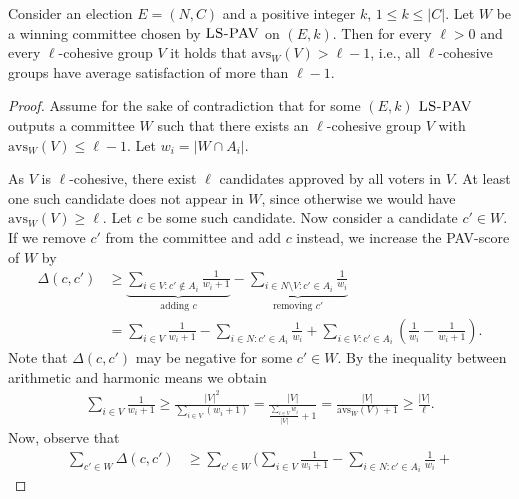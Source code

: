 \documentclass[envcountsame]{llncs}
\newcommand{\ejrls}{{{\textsc{LS-PAV}}}}
\newcommand{\aver}[1]{{{\mathrm{avs}_{#1}}}}
\begin{document}
\begin{theorem}\label{thm:avrep}
Consider an election $E=(N, C)$ and a positive integer $k$, $1\le k \le |C|$.
Let $W$ be a winning committee chosen by $\ejrls$ on $(E, k)$.
Then for every $\ell>0$ and every $\ell$-cohesive group $V$ it holds that $\aver{W}(V)>\ell-1$, 
i.e., all $\ell$-cohesive groups have average satisfaction of more than $\ell-1$.
\end{theorem}
\begin{proof}
Assume for the sake of contradiction that for some $(E, k)$
$\ejrls$ outputs a committee $W$ such that there exists an $\ell$-cohesive group $V$ with $\aver{W}(V)\leq\ell-1$. 
Let $w_i = |W \cap A_i|$. 

As $V$ is $\ell$-cohesive, there exist $\ell$ candidates approved by all voters in $V$.
At least one such candidate does not appear in $W$, since otherwise we would have 
$\aver{W}(V)\geq\ell$. Let $c$ be some such candidate.
Now consider a candidate $c' \in W$.
If we remove $c'$ from the committee and add $c$ instead,
we increase the PAV-score of $W$ by 
\begin{align*}
\Delta(c, c') %
              &\ge \underbrace{\sum_{i \in V:c'\notin A_i} \frac{1}{w_i + 1} }_\text{adding $c$}  - \underbrace{\sum_{i\in N\setminus V\colon c' \in A_i} \frac{1}{w_i}}_\text{removing $c'$}  \\
              &= \sum_{i \in V} \frac{1}{w_i + 1} - \sum_{i\in N\colon c' \in A_i} \frac{1}{w_i} + \sum_{i \in V\colon c' \in A_i}\left(\frac{1}{w_i} - \frac{1}{w_i+1}\right).
\end{align*}
Note that $\Delta(c, c')$ may be negative for some $c'\in W$.
By the inequality between arithmetic and harmonic means we obtain
\begin{align}\label{eq:amhm}
\sum_{i \in V} \frac{1}{w_i + 1} \geq \frac{|V|^2}{\sum_{i \in V} (w_i +1)}= 
\frac{|V|}{\frac{\sum_{i \in V}w_i}{|V|}  + 1} = \frac{|V|}{\aver{W}(V)+1}\geq \frac{|V|}{\ell}.
\end{align}
Now, observe that
{\allowdisplaybreaks
\begin{align*}
\sum_{c' \in W} \Delta(c, c') 
&\ge \sum_{c' \in W} \Bigg(\sum_{i \in V} \frac{1}{w_i + 1} - \sum_{i\in N\colon c' \in A_i} \frac{1}{w_i} + 

\end{align*}}
\end{proof}
\end{document}
